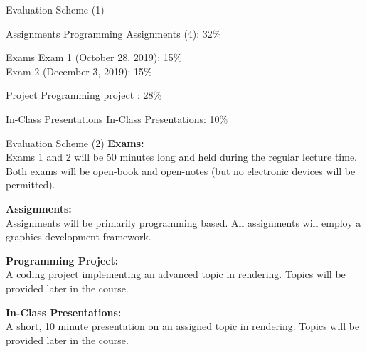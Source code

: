 \documentclass[11pt]{beamer}
\begin{document}
  \begin{frame}{Evaluation Scheme (1)}
    \begin{block}{Assignments}
      Programming Assignments (4): \hspace*{\fill}32\%
    \end{block}

    \begin{block}{Exams}
      Exam 1 (October 28, 2019): \hspace*{\fill}15\% \\
      Exam 2 (December 3, 2019): \hspace*{\fill}15\% \\
    \end{block}

    \begin{block}{Project}
      Programming project : \hspace*{\fill}28\%
    \end{block}

    \begin{block}{In-Class Presentations}
      In-Class Presentations: \hspace*{\fill}10\%
    \end{block}
  \end{frame}

  \begin{frame}{Evaluation Scheme (2)}
    \textbf{Exams:}\\
    Exams 1 and 2 will be 50 minutes long and held during the regular lecture
    time. Both exams will be open-book and open-notes (but no electronic
    devices will be permitted).

    \textbf{Assignments:}\\
    Assignments will be primarily programming based. All assignments will employ
    a graphics development framework.

    \textbf{Programming Project:}\\
    A coding project implementing an advanced topic in rendering. Topics will be
    provided later in the course.

    \textbf{In-Class Presentations:}\\
    A short, 10 minute presentation on an assigned topic in rendering. Topics
    will be provided later in the course.
  \end{frame}
\end{document}
